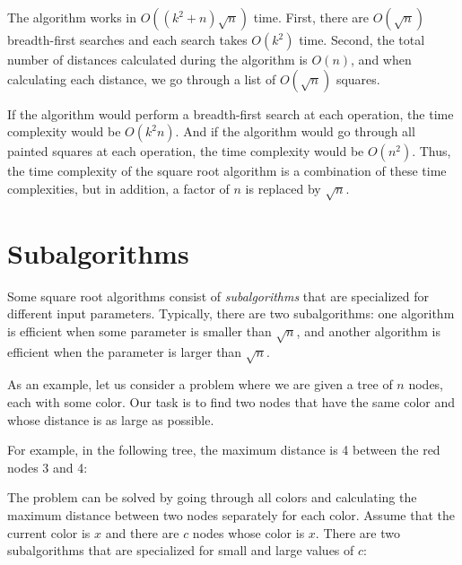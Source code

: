 The algorithm works in
$O((k^2+n) \sqrt n)$ time.
First, there are $O(\sqrt n)$ breadth-first searches
and each search takes $O(k^2)$ time.
Second, the total number of
distances calculated during the algorithm
is $O(n)$, and when calculating each distance,
we go through a list of $O(\sqrt n)$ squares.

If the algorithm would perform a breadth-first search
at each operation, the time complexity would be
$O(k^2 n)$.
And if the algorithm would go through all painted
squares at each operation,
the time complexity would be $O(n^2)$.
Thus, the time complexity of the square root algorithm
is a combination of these time complexities,
but in addition, a factor of $n$ is replaced by $\sqrt n$.

\section{Subalgorithms}

Some square root algorithms consist of
\emph{subalgorithms} that are specialized for different
input parameters.
Typically, there are two subalgorithms:
one algorithm is efficient when
some parameter is smaller than $\sqrt n$,
and another algorithm is efficient
when the parameter is larger than $\sqrt n$.

As an example, let us consider a problem where
we are given a tree of $n$ nodes,
each with some color. Our task is to find two nodes
that have the same color and whose distance
is as large as possible.

For example, in the following tree,
the maximum distance is 4 between
the red nodes 3 and 4:

\begin{center}
\end{center}

The problem can be solved by going through
all colors and calculating
the maximum distance between two nodes
separately for each color.
Assume that the current color is $x$ and
there are $c$ nodes whose color is $x$.
There are two subalgorithms
that are specialized for small and large
values of $c$:


